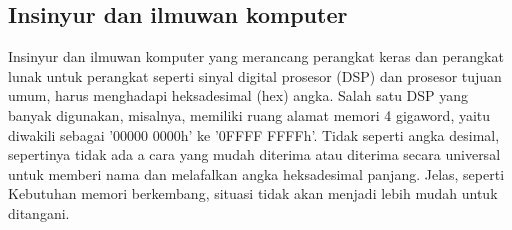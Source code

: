 \subsection{Insinyur dan ilmuwan komputer}
Insinyur dan ilmuwan komputer yang merancang perangkat keras dan perangkat lunak untuk perangkat seperti sinyal digital
prosesor (DSP) dan prosesor tujuan umum, harus menghadapi heksadesimal (hex)
angka. Salah satu DSP yang banyak digunakan, misalnya, memiliki ruang alamat memori 4 gigaword, yaitu
diwakili sebagai '00000 0000h' ke '0FFFF FFFFh'. Tidak seperti angka desimal, sepertinya tidak ada a
cara yang mudah diterima atau diterima secara universal untuk memberi nama dan melafalkan angka heksadesimal panjang. Jelas, seperti
Kebutuhan memori berkembang, situasi tidak akan menjadi lebih mudah untuk ditangani.
